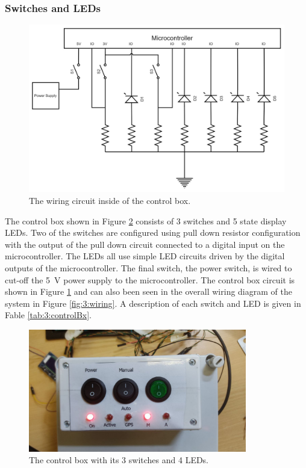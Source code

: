 	\subsubsection{Switches and LEDs}
	\begin{figure}
		\begin{center}
			\includegraphics[width=0.65\linewidth]{figures/BoxCircuit}
			\caption{The wiring circuit inside of the control box.}
			\label{fig:3:controlCircuit}
		\end{center}
	\end{figure}
	The control box shown in Figure \ref{fig:3:controlBox} consists of 3 switches and 5 state display LEDs. Two of the switches are configured using pull down resistor configuration with the output of the pull down circuit connected to a digital input on the microcontroller. The LEDs all use simple LED circuits driven by the digital outputs of the microcontroller. The final switch, the power switch, is wired to cut-off the \SI{5}{\volt} power supply to the microcontroller. The control box circuit is shown in Figure \ref{fig:3:controlCircuit} and can also been seen in the overall wiring diagram of the system in Figure \ref{fig:3:wiring}. A description of each switch and LED is given in Fable \ref{tab:3:controlBx}.
	\begin{figure}[hb]
		\begin{center}
			\includegraphics[width = 0.85\textwidth]{figures/controlBox.jpg}
			\caption{The control box with its 3 switches and 4 LEDs.}
			\label{fig:3:controlBox}
		\end{center}
	\end{figure}
